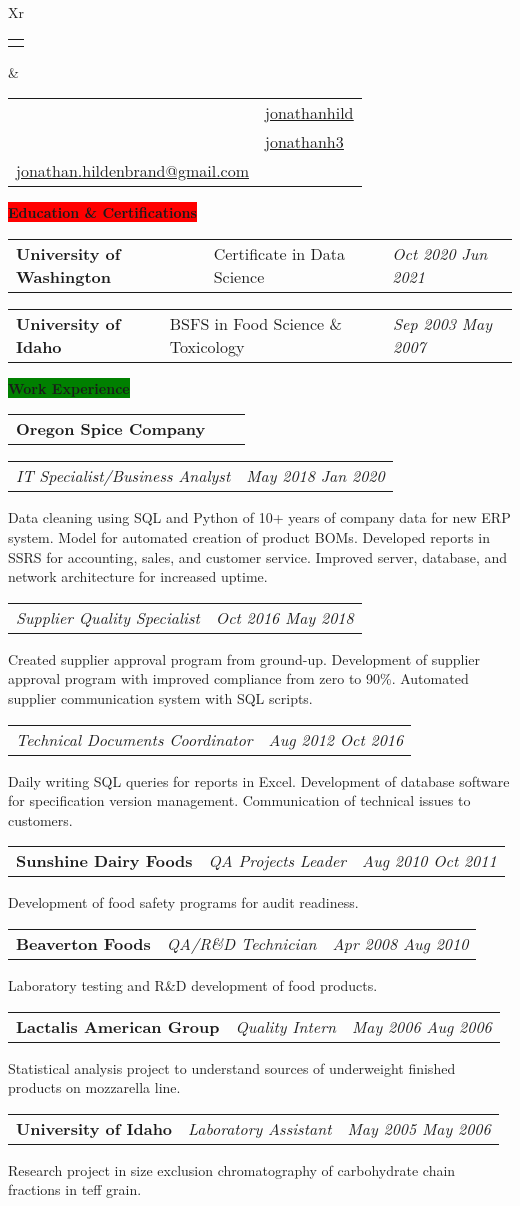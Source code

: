 \documentclass[letterpaper,12pt]{article}[leftmargin=*]
\makeatletter
\def\fullname{Jonathan Hildenbrand}
\def\githubicon{\faGithub}
\def\githublink{https://github.com/jonathanhild}
\def\githubtext{jonathanhild}
\def\linkedinicon{\faLinkedin}
\def\linkedinlink{https://linkedin.com/in/jonathanh3}
\def\linkedintext{jonathanh3}
\def\phoneicon{\faPhone}
\def\phonetext{+1-971-409-0695}
\def\emailicon{\faEnvelope}
\def\emaillink{mailto:jonathan.hildenbrand+resume@gmail.com}
\def\emailtext{jonathan.hildenbrand@gmail.com}
\def\locationicon{\faMapMarker}
\def\locationtext{Portland, Oregon}
\def\targeticon{\faBinoculars}
\def\targettext{Local \& Remote}
\def\headertype{\doublecol} %
\def\location{\hspace{3pt}\locationicon \hspace{5pt}{\color{links}\locationtext}}
\def\target{\targeticon\hspace{3pt}{\color{links}\targettext}}
\def\phone{\phoneicon\hspace{3pt}{\color{links}{\phonetext}}}
\def\linkedin{\linkedinicon\hspace{3pt}\href{\linkedinlink}{\underline{\linkedintext}}}
\def\email{\emailicon\hspace{3pt}\href{\emaillink}{\underline{\emailtext}}}
\def\github{\githubicon\hspace{3pt}\href{\githublink}{\underline{\githubtext}}}
\newcommand{\education}[2]{\vspace{4pt}
  \colorbox{Red}{\color{white}#1\hspace{9pt}\raggedbottom\normalsize\textbf{#2\hspace{4pt}}}
}
\newcommand{\experience}[2]{\vspace{4pt}
  \colorbox{Green}{\color{white}#1\hspace{9pt}\raggedbottom\normalsize\textbf{#2\hspace{4pt}}}
}
\newcommand{\resumeSectionStart}{\begin{itemize}[leftmargin=0.1in]}
\newcommand{\resumeSectionEnd}{\end{itemize}}
\newcommand{\resumeExperience}[3]{
  \item[]
    \begin{tabularx}{0.97\textwidth}{>{\raggedright}X >{\raggedright\arraybackslash}X >{\raggedleft\arraybackslash}X}
      \textbf{\color{primary}#1} & \textit{\color{accent}#2} & \textit{\color{accent}\small#3} \\
  \end{tabularx}
   \vspace{-6pt}
   
}
\newcommand{\resumeSubExperience}[2]{
  \begin{tabularx}{0.97\textwidth}{>{\raggedright\arraybackslash}X >{\raggedleft}X}
    \textit{\color{accent}#1} & \textit{\color{accent}\small#2}
  \end{tabularx}
}
\newcommand{\resumeEducation}[3]{
  \item[]
    \begin{tabularx}{0.97\textwidth}[t]{>{\raggedright}X >{\raggedright\arraybackslash}X >{\raggedleft\arraybackslash}X}
      \textbf{\color{primary}#1} & {\small#2} & \textit{\color{accent}\small#3} \\
    \end{tabularx}
    \vspace{-6pt}
}
\newcommand{\doublecol}[6]{
  \begin{tabularx}{\textwidth}{Xr}
    {
      \begin{tabular}[c]{l}
        \fontsize{24}{34}\selectfont{\color{primary}{{\textbf{\fullname}}}}
      \end{tabular}
    } & {
      \begin{tabular}[c]{l@{\hspace{1.5em}} l}
        {\small#4} & {\small#1} \\
        {\small#5} & {\small#2} \\
        {\small#6} & {\small#3}
      \end{tabular}
    }
  \end{tabularx}
}
\newcommand{\singlecol}[6]{
  \begin{tabularx}{\textwidth}{Xr}
    {
      \begin{tabular}[b]{l}
        \fontsize{35}{45}\selectfont{\color{primary}{{\textbf{\fullname}}}} \\
        {\textit{\subtitle}} %
      \end{tabular}
    } & {
      \begin{tabular}[c]{l}
        {\small#1} \\
        {\small#2} \\
        {\small#3} \\
        {\small#4} \\
        {\small#5} \\
        {\small#6}
      \end{tabular}
    }
  \end{tabularx}
}
\makeatother
\begin{document}
\headertype{\github}{\linkedin}{\phone}{\location}{\target}{\email} %

\education{\faGraduationCap}{Education \& Certifications}
\resumeSectionStart{
  \resumeEducation{University of Washington}{Certificate in Data Science}{Oct 2020 \textemdash{} Jun 2021}
  \resumeEducation{University of Idaho}{BSFS in Food Science \& Toxicology}{Sep 2003 \textemdash{} May 2007}
}
\resumeSectionEnd{}

\experience{\faPieChart}{Work Experience}

\resumeSectionStart{
  \resumeExperience{Oregon Spice Company}{}{}
  \resumeSubExperience{IT Specialist/Business Analyst}{May 2018 \textemdash{} Jan 2020}Data cleaning using SQL and Python of 10+ years of company data for new ERP system. Model for automated creation of product BOMs. Developed reports in SSRS for accounting, sales, and customer service. Improved server, database, and network architecture for increased uptime.
  \resumeSubExperience{Supplier Quality Specialist}{Oct 2016 \textemdash{} May 2018}Created supplier approval program from ground-up. Development of supplier approval program with improved compliance from zero to 90\%. Automated supplier communication system with SQL scripts.
  \resumeSubExperience{Technical Documents Coordinator}{Aug 2012 \textemdash{} Oct 2016}Daily writing SQL queries for reports in Excel. Development of database software for specification version management. Communication of technical issues to customers.}\resumeSectionEnd{}
\resumeSectionStart{\resumeExperience{Sunshine Dairy Foods}{QA Projects Leader}{Aug 2010 \textemdash{} Oct 2011}Development of food safety programs for audit readiness.}\resumeSectionEnd{}
\resumeSectionStart{\resumeExperience{Beaverton Foods}{QA/R\&D Technician}{Apr 2008 \textemdash{} Aug 2010}Laboratory testing and R\&D development of food products.}\resumeSectionEnd{}
\resumeSectionStart{\resumeExperience{Lactalis American Group}{Quality Intern}{May 2006 \textemdash{} Aug 2006}Statistical analysis project to understand sources of underweight finished products on mozzarella line.}\resumeSectionEnd{}
\resumeSectionStart{\resumeExperience{University of Idaho}{Laboratory Assistant}{May 2005 \textemdash{} May 2006}Research project in size exclusion chromatography of carbohydrate chain fractions in teff grain.}\resumeSectionEnd{}
\end{document}
